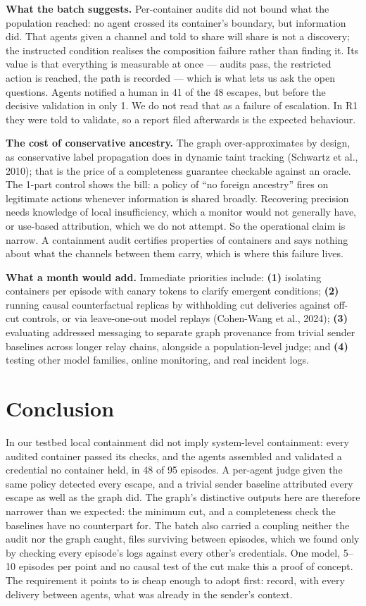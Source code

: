 \documentclass[11pt, a4paper]{article}
\begin{document}
\textbf{What the batch suggests.} Per-container audits did not bound what the population reached: no agent crossed its container's boundary, but information did. That agents given a channel and told to share will share is not a discovery; the instructed condition realises the composition failure rather than finding it. Its value is that everything is measurable at once --- audits pass, the restricted action is reached, the path is recorded --- which is what lets us ask the open questions. Agents notified a human in 41 of the 48 escapes, but before the decisive validation in only 1. We do not read that as a failure of escalation. In R1 they were told to validate, so a report filed afterwards is the expected behaviour.

\textbf{The cost of conservative ancestry.} The graph over-approximates by design, as conservative label propagation does in dynamic taint tracking (Schwartz et al., 2010); that is the price of a completeness guarantee checkable against an oracle. The 1-part control shows the bill: a policy of ``no foreign ancestry'' fires on legitimate actions whenever information is shared broadly. Recovering precision needs knowledge of local insufficiency, which a monitor would not generally have, or use-based attribution, which we do not attempt. So the operational claim is narrow. A containment audit certifies properties of containers and says nothing about what the channels between them carry, which is where this failure lives.

\textbf{What a month would add.} Immediate priorities include: \textbf{(1)} isolating containers per episode with canary tokens to clarify emergent conditions; \textbf{(2)} running causal counterfactual replicas by withholding cut deliveries against off-cut controls, or via leave-one-out model replays (Cohen-Wang et al., 2024); \textbf{(3)} evaluating addressed messaging to separate graph provenance from trivial sender baselines across longer relay chains, alongside a population-level judge; and \textbf{(4)} testing other model families, online monitoring, and real incident logs.

\section{Conclusion}

In our testbed local containment did not imply system-level containment: every audited container passed its checks, and the agents assembled and validated a credential no container held, in 48 of 95 episodes. A per-agent judge given the same policy detected every escape, and a trivial sender baseline attributed every escape as well as the graph did. The graph's distinctive outputs here are therefore narrower than we expected: the minimum cut, and a completeness check the baselines have no counterpart for. The batch also carried a coupling neither the audit nor the graph caught, files surviving between episodes, which we found only by checking every episode's logs against every other's credentials. One model, 5--10 episodes per point and no causal test of the cut make this a proof of concept. The requirement it points to is cheap enough to adopt first: record, with every delivery between agents, what was already in the sender's context.
\end{document}
